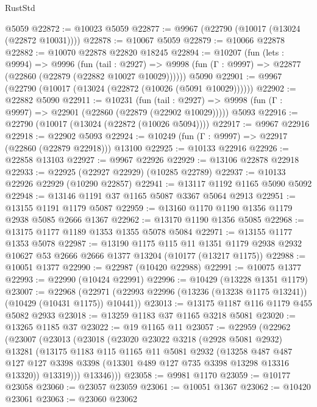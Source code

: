\begin{lexlean}{RustStd}
\begin{coremodule}
    @5059
@22872 := @10023 @5059
@22877 := @9967 (@22790 (@10017 (@13024 (@22872 @10031))))
@22878 := @10067 @5059
@22879 := @10066 @22878
@22882 := @10070 @22878 @22820 @18245
@22894 := @10207
    (fun (lets : @9994) =>
    @9996
      (fun (tail : @2927) =>
      @9998 (fun (Γ : @9997) => @22877 (@22860 (@22879 (@22882 @10027 @10029))))))
    @5090
@22901 := @9967 (@22790 (@10017 (@13024 (@22872 (@10026 (@5091 @10029))))))
@22902 := @22882 @5090
@22911 := @10231
    (fun (tail : @2927) => @9998 (fun (Γ : @9997) => @22901 (@22860 (@22879 (@22902 @10029)))))
    @5093
@22916 := @22790 (@10017 (@13024 (@22872 (@10026 @5094))))
@22917 := @9967 @22916
@22918 := @22902 @5093
@22924 := @10249 (fun (Γ : @9997) => @22917 (@22860 (@22879 @22918))) @13100
@22925 := @10133 @22916
@22926 := @22858 @13103
@22927 := @9967 @22926
@22929 := @13106 @22878 @22918
@22933 := @22925 (@22927 @22929) (@10285 @22789)
@22937 := @10133 @22926 @22929 (@10290 @22857)
@22941 := @13117 @1192 @1165 @5090 @5092
@22948 := @13146 @1191 @37 @1165 @5087 @3367 @5064 @2913
@22951 := @13155 @1191 @1179 @5087
@22959 := @13160 @1170 @1190 @1356 @1179 @2938 @5085 @2666 @1367
@22962 := @13170 @1190 @1356 @5085
@22968 := @13175 @1177 @1189 @1353 @1355 @5078 @5084
@22971 := @13155 @1177 @1353 @5078
@22987 := @13190
    @1175
    @115
    @11
    @1351
    @1179
    @2938
    @2932
    @10627
    @53
    @2666
    @2666
    @1377
    @13204
    (@10177 (@13217 @1175))
@22988 := @10051 @1377
@22990 := @22987 (@10420 @22988)
@22991 := @10075 @1377
@22993 := @22990 (@10424 @22991)
@22996 := @10429 (@13228 @1351 @1179)
@23007 := @22968
    (@22971 (@22993 @22996 (@13236 (@13238 @1175 @13241)) (@10429 (@10431 @1175)) @10441))
@23013 := @13175 @1187 @116 @1179 @455 @5082 @2933
@23018 := @13259 @1183 @37 @1165 @3218 @5081
@23020 := @13265 @1185 @37
@23022 := @19 @1165 @11
@23057 := @22959
    (@22962
      (@23007
        (@23013
          (@23018
            (@23020
              @23022
              @3218
              (@2928 @5081 @2932)
              @13281
              (@13175
                @1183
                @115
                @1165
                @11
                @5081
                @2932
                (@13258
                  @487
                  @487
                  @127
                  @127
                  @3398
                  @3398
                  (@13301 @489 @127 @735 @3398 @13298 @13316 @13320))
                @13319)))
          @13346)))
@23058 := @9981 @1170
@23059 := @10177 @23058
@23060 := @23057 @23059
@23061 := @10051 @1367
@23062 := @10420 @23061
@23063 := @23060 @23062

\end{coremodule}
\end{lexlean}
